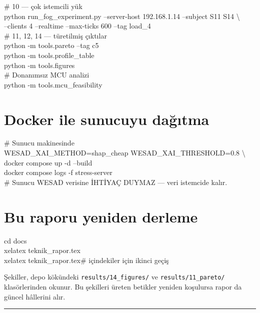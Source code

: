 \documentclass[11pt,a4paper]{report}
\newcommand{\dosya}[1]{\texttt{\footnotesize #1}}
\begin{document}
\begin{tcolorbox}[colback=acikGri,colframe=black!30,boxrule=0.6pt,breakable]
\# 10 --- çok istemcili yük\\
python run\_fog\_experiment.py --server-host 192.168.1.14 --subject S11 S14 \textbackslash\\
\hspace*{2em}--clients 4 --realtime --max-ticks 600 --tag load\_4\\[0.5em]

\# 11, 12, 14 --- türetilmiş çıktılar\\
python -m tools.pareto --tag c5\\
python -m tools.profile\_table\\
python -m tools.figures\\[0.5em]

\# Donanımsız MCU analizi\\
python -m tools.mcu\_feasibility
\end{tcolorbox}

\section{Docker ile sunucuyu dağıtma}

\begin{tcolorbox}[colback=acikGri,colframe=black!30,boxrule=0.6pt]
\ttfamily\footnotesize
\# Sunucu makinesinde\\
WESAD\_XAI\_METHOD=shap\_cheap WESAD\_XAI\_THRESHOLD=0.8 \textbackslash\\
docker compose up -d --build\\
docker compose logs -f stress-server\\[0.5em]
\# Sunucu WESAD verisine İHTİYAÇ DUYMAZ --- veri istemcide kalır.
\end{tcolorbox}

\section{Bu raporu yeniden derleme}

\begin{tcolorbox}[colback=acikGri,colframe=black!30,boxrule=0.6pt]
\ttfamily\footnotesize
cd docs\\
xelatex teknik\_rapor.tex\\
xelatex teknik\_rapor.tex\hspace{2em}\# içindekiler için ikinci geçiş
\end{tcolorbox}

Şekiller, depo kökündeki \dosya{results/14\_figures/} ve
\dosya{results/11\_pareto/} klasörlerinden okunur. Bu şekilleri üreten
betikler yeniden koşulursa rapor da güncel hâllerini alır.

\vspace{1.5em}
\begin{center}
\rule{0.4\textwidth}{0.4pt}
\end{center}
\end{document}
